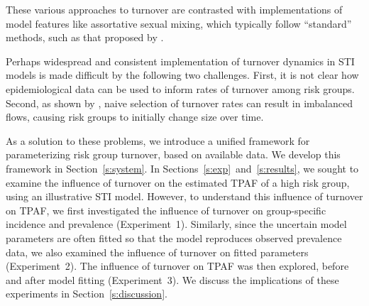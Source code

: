 These various approaches to turnover are contrasted with
implementations of model features like assortative sexual mixing,
which typically follow ``standard'' methods,
such as that proposed by \citet{Nold1980}.
\par
Perhaps widespread and consistent implementation of turnover dynamics in STI models
is made difficult by the following two challenges.
First, it is not clear how epidemiological data can be used to
inform rates of turnover among risk groups.
Second, as shown by \citet{Boily2015},
naive selection of turnover rates can result in imbalanced flows,
causing risk groups to initially change size over time.
\par
As a solution to these problems,
we introduce a unified framework for
parameterizing risk group turnover, based on available data.
We develop this framework in Section~\ref{s:system}.
In Sections~\ref{s:exp}~and~\ref{s:results},
we sought to examine the influence of turnover
on the estimated TPAF of a high risk group,
using an illustrative STI model.
However, to understand this influence of turnover on TPAF,
we first investigated the influence of turnover on
group-specific incidence and prevalence
(Experiment~1).
Similarly, since the uncertain model parameters are often fitted
so that the model reproduces observed prevalence data,
we also examined the influence of turnover on fitted parameters
(Experiment~2).
The influence of turnover on TPAF was then explored,
before and after model fitting
(Experiment~3).
We discuss the implications of these experiments
in Section~\ref{s:discussion}.